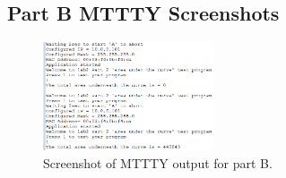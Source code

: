 \documentclass[10pt, letterpaper, titlepage]{article} %
\begin{document}
\subsection{Part B MTTTY Screenshots}
\begin{figure}[H]
   \includegraphics[width=0.45\textwidth]{mttypartB.png}
   \centering  
   \caption{Screenshot of MTTTY output for part B.} 
   \label{figure:7}
\end{figure}
\end{document}

